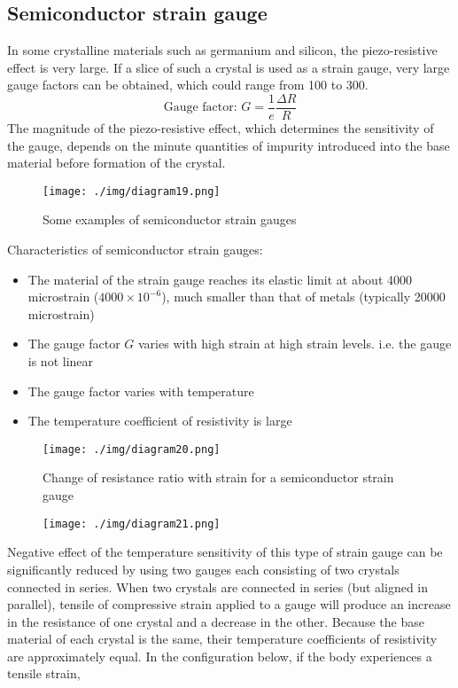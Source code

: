 \subsection{Semiconductor strain gauge}
In some crystalline materials such as germanium and silicon, the piezo-resistive effect is very large. If a slice of such a crystal is used as a strain gauge, very large gauge factors can be obtained, which could range from 100 to 300.
\begin{equation}
  \textrm{Gauge factor: }G = \frac{1}{e}\frac{\Delta R}{R}
\end{equation}
The magnitude of the piezo-resistive effect, which determines the sensitivity of the gauge, depends on the minute quantities of impurity introduced into the base material before formation of the crystal.
\begin{figure}[H]
  \centering
  \texttt{[image: ./img/diagram19.png]}
  \caption{Some examples of semiconductor strain gauges}
\end{figure}
Characteristics of semiconductor strain gauges:
\begin{itemize}
  \item The material of the strain gauge reaches its elastic limit at about 4000 microstrain ($4000\times 10^{-6}$), much smaller than that of metals (typically 20000 microstrain)
  \item The gauge factor $G$ varies with high strain at high strain levels. i.e. the gauge is not linear
  \item The gauge factor varies with temperature
  \item The temperature coefficient of resistivity is large
\end{itemize}
\begin{figure}[H]
  \centering
  \texttt{[image: ./img/diagram20.png]}
  \caption{Change of resistance ratio with strain for a semiconductor strain gauge}
\end{figure}
\begin{figure}[H]
  \centering
  \texttt{[image: ./img/diagram21.png]}
\end{figure}
Negative effect of the temperature sensitivity of this type of strain gauge can be significantly reduced by using two gauges each consisting of two crystals connected in series. When two crystals are connected in series (but aligned in parallel), tensile of compressive strain applied to a gauge will produce an increase in the resistance of one crystal and a decrease in the other. Because the base material of each crystal is the same, their temperature coefficients of resistivity are approximately equal. In the configuration below, if the body experiences a tensile strain,
